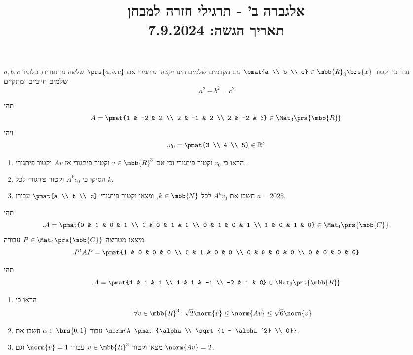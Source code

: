 \documentclass[a4paper,10pt,twoside,openany]{article}
\title{
אלגברה ב' - תרגילי חזרה למבחן
\\
\vspace{1cm}
\large{תאריך הגשה: 7.9.2024}
}
\date{}
\begin{document}
\maketitle

\begin{exercise}
נגיד כי וקטור
$\pmat{a \\ b \\ c} \in \mbb{R}_3\brs{x}$
עם מקדמים שלמים הינו
\emph{וקטור פיתגורי}
אם
$\prs{a,b,c}$
שלשה פיתגורית, כלומר
$a,b,c$
שלמים חיוביים ומתקיים
\[\text{.} a^2 + b^2 = c^2\]

תהי
\[A = \pmat{1 & -2 & 2 \\ 2 & -1 & 2 \\ 2 & -2 & 3} \in \Mat_3\prs{\mbb{R}}\]
ויהי
\[\text{.} v_0 = \pmat{3 \\ 4 \\ 5} \in \mathbb{R}^3\]

\begin{enumerate}
\item
הראו כי
$v_0$
וקטור פיתגורי וכי אם
$v \in \mbb{R}^3$
וקטור פיתגורי אז
$Av$
וקטור פיתגורי.

\item
הסיקו כי
$A^k v_0$
וקטור פיתגורי לכל
$k$.

\item
חשבו את
$A^k v_0$
לכל
$k \in \mbb{N}$,
ומצאו וקטור פיתגורי
$\pmat{a \\ b \\ c}$
עבורו
$a = 2025$.
\end{enumerate}
\end{exercise}

\begin{exercise}
תהי
\[\text{.} A = \pmat{0 & 1 & 0 & 1 \\ 1 & 0 & 1 & 0 \\ 0 & 1 & 0 & 1 \\ 1 & 0 & 1 & 0} \in \Mat_4\prs{\mbb{C}}\]
מיצאו מטריצה
$P \in \Mat_4\prs{\mbb{C}}$
עבורה
\[\text{.} P^t A P = \pmat{1 & 0 & 0 & 0 \\ 0 & 1 & 0 & 0 \\ 0 & 0 & 0 & 0 \\ 0 & 0 & 0 & 0}\]
\end{exercise}

\begin{exercise}
תהי
\[\text{.} A = \pmat{1 & 1 & 1 \\ 1 & 1 & -1 \\ -2 & 1 & 0} \in \Mat_3\prs{\mbb{R}}\]

\begin{enumerate}
\item הראו כי
\[\text{.} \forall v \in \mbb{R}^3 \colon \sqrt{2} \norm{v} \leq \norm{Av} \leq \sqrt{6} \norm{v}\]

\item עבור
$\alpha \in \brs{0,1}$
חשבו את
$\norm{A \pmat{\alpha \\ \sqrt{1 - \alpha^2} \\ 0}}$.

\item מצאו וקטור
$v \in \mbb{R}^3$
עבורו
$\norm{v} = 1$
וגם
$\norm{Av} = 2$.
\end{enumerate}
\end{exercise}
\end{document}
